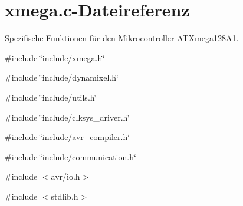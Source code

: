 \section{xmega.c-\/Dateireferenz}
\label{xmega_8c}


Spezifische Funktionen für den Mikrocontroller ATXmega128A1.  


{\ttfamily \#include \char`\"{}include/xmega.h\char`\"{}}\par
{\ttfamily \#include \char`\"{}include/dynamixel.h\char`\"{}}\par
{\ttfamily \#include \char`\"{}include/utils.h\char`\"{}}\par
{\ttfamily \#include \char`\"{}include/clksys\_\-driver.h\char`\"{}}\par
{\ttfamily \#include \char`\"{}include/avr\_\-compiler.h\char`\"{}}\par
{\ttfamily \#include \char`\"{}include/communication.h\char`\"{}}\par
{\ttfamily \#include $<$avr/io.h$>$}\par
{\ttfamily \#include $<$stdlib.h$>$}\par
